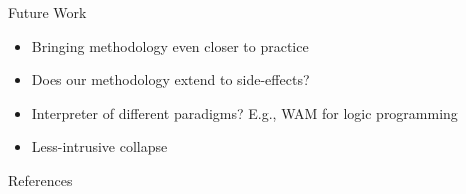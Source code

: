 \documentclass{beamer}
\begin{document}
\begin{frame}{Future Work}
    \begin{itemize}
        \item Bringing methodology even closer to practice
        \item Does our methodology extend to side-effects?
        \item Interpreter of different paradigms? E.g., WAM for logic programming
        \item Less-intrusive collapse
    \end{itemize}
\end{frame}

\appendix
\begin{frame}{References}
\fontsize{9pt}{7.2}\selectfont

\end{frame}
\end{document}
